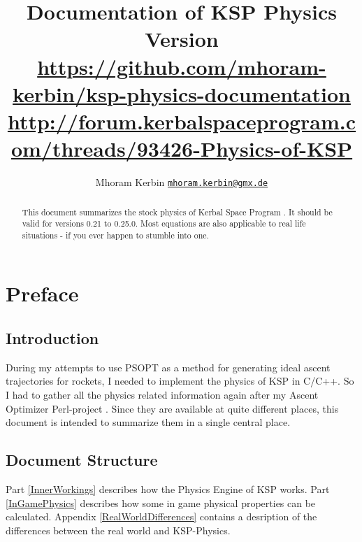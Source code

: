 \documentclass[11pt]{report}
\begin{document}
\title{Documentation of KSP Physics\\\small{Version }\\\vspace{1 em}\url{https://github.com/mhoram-kerbin/ksp-physics-documentation}\\\url{http://forum.kerbalspaceprogram.com/threads/93426-Physics-of-KSP}}
\author {Mhoram Kerbin \href{mailto:mhoram.kerbin@gmx.de}{\nolinkurl{mhoram.kerbin@gmx.de}}}

\maketitle

\begin{abstract}

  This document summarizes the stock physics of Kerbal Space Program
  \cite{KSP}. It should be valid for versions 0.21 to 0.25.0. Most
  equations are also applicable to real life situations - if you ever
  happen to stumble into one.

\end{abstract}

\tableofcontents

\chapter{Preface}

\section{Introduction}

During my attempts to use PSOPT as a method for generating ideal
ascent trajectories for rockets, I needed to implement the physics of
KSP in C/C++. So I had to gather all the physics related information
again after my Ascent Optimizer Perl-project \cite{PAO}. Since they
are available at quite different places, this document is intended to
summarize them in a single central place.

\section{Document Structure}

Part \ref{InnerWorkings} describes how the Physics Engine of KSP
works. Part \ref{InGamePhysics} describes how some in game physical
properties can be calculated. Appendix \ref{RealWorldDifferences}
contains a desription of the differences between the real world and
KSP-Physics.
\end{document}
